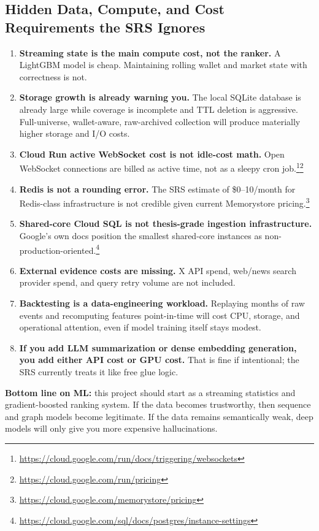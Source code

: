 \documentclass[11pt,letterpaper]{article}
\begin{document}
\subsection{Hidden Data, Compute, and Cost Requirements the SRS Ignores}

\begin{enumerate}[leftmargin=1.5em]
    \item \textbf{Streaming state is the main compute cost, not the ranker.} A LightGBM model is cheap. Maintaining rolling wallet and market state with correctness is not.
    \item \textbf{Storage growth is already warning you.} The local SQLite database is already large while coverage is incomplete and TTL deletion is aggressive. Full-universe, wallet-aware, raw-archived collection will produce materially higher storage and I/O costs.
    \item \textbf{Cloud Run active WebSocket cost is not idle-cost math.} Open WebSocket connections are billed as active time, not as a sleepy cron job.\footnote{\url{https://cloud.google.com/run/docs/triggering/websockets}}\footnote{\url{https://cloud.google.com/run/pricing}}
    \item \textbf{Redis is not a rounding error.} The SRS estimate of \$0--10/month for Redis-class infrastructure is not credible given current Memorystore pricing.\footnote{\url{https://cloud.google.com/memorystore/pricing}}
    \item \textbf{Shared-core Cloud SQL is not thesis-grade ingestion infrastructure.} Google's own docs position the smallest shared-core instances as non-production-oriented.\footnote{\url{https://cloud.google.com/sql/docs/postgres/instance-settings}}
    \item \textbf{External evidence costs are missing.} X API spend, web/news search provider spend, and query retry volume are not included.
    \item \textbf{Backtesting is a data-engineering workload.} Replaying months of raw events and recomputing features point-in-time will cost CPU, storage, and operational attention, even if model training itself stays modest.
    \item \textbf{If you add LLM summarization or dense embedding generation, you add either API cost or GPU cost.} That is fine if intentional; the SRS currently treats it like free glue logic.
\end{enumerate}

\textbf{Bottom line on ML:} this project should start as a streaming statistics and gradient-boosted ranking system. If the data becomes trustworthy, then sequence and graph models become legitimate. If the data remains semantically weak, deep models will only give you more expensive hallucinations.
\end{document}

